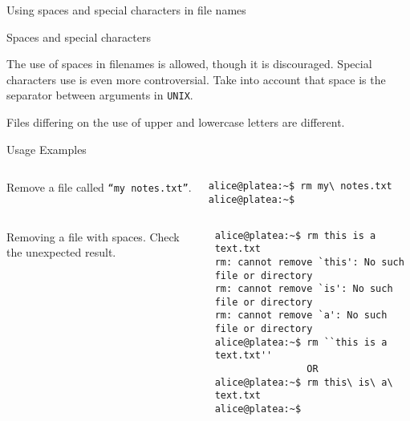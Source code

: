 \begin{frame}[t,fragile]{Using spaces and special characters in file names}

  \vspace{-0.3cm}
  \begin{block}{Spaces and special characters}
    {\footnotesize
The use of spaces in filenames is allowed, though it is discouraged. Special characters use is even more controversial. Take into account that \alert{space} is the separator between arguments in \texttt{UNIX}.

Files differing on the use of upper and lowercase letters are \alert{different}.



  Usage Examples
}


{\scriptsize

  \begin{columns}
      Remove a file called \texttt{``my notes.txt''}.
        \begin{lstlisting}
alice@platea:~$ rm my\ notes.txt
alice@platea:~$ 
        \end{lstlisting}
    \end{columns}
  \begin{columns}
          Removing a file with spaces. Check the unexpected result.
      \begin{lstlisting}
alice@platea:~$ rm this is a text.txt
rm: cannot remove `this': No such file or directory
rm: cannot remove `is': No such file or directory
rm: cannot remove `a': No such file or directory
alice@platea:~$ rm ``this is a text.txt''
                OR
alice@platea:~$ rm this\ is\ a\ text.txt
alice@platea:~$
        \end{lstlisting}
    \end{columns}
  }
  \end{block}
  
\end{frame}

